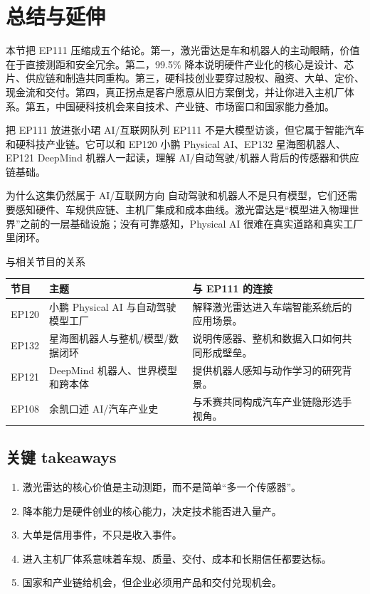 \section{总结与延伸}

本节把 EP111 压缩成五个结论。第一，激光雷达是车和机器人的主动眼睛，价值在于直接测距和安全冗余。第二，99.5\% 降本说明硬件产业化的核心是设计、芯片、供应链和制造共同重构。第三，硬科技创业要穿过股权、融资、大单、定价、现金流和交付。第四，真正拐点是客户愿意从旧方案倒戈，并让你进入主机厂体系。第五，中国硬科技机会来自技术、产业链、市场窗口和国家能力叠加。

\begin{importantbox}{把 EP111 放进张小珺 AI/互联网队列}
EP111 不是大模型访谈，但它属于智能汽车和硬科技产业链。它可以和 EP120 小鹏 Physical AI、EP132 星海图机器人、EP121 DeepMind 机器人一起读，理解 AI/自动驾驶/机器人背后的传感器和供应链基础。
\end{importantbox}

\begin{knowledgebox}{为什么这集仍然属于 AI/互联网方向}
自动驾驶和机器人不是只有模型，它们还需要感知硬件、车规供应链、主机厂集成和成本曲线。激光雷达是“模型进入物理世界”之前的一层基础设施；没有可靠感知，Physical AI 很难在真实道路和真实工厂里闭环。
\end{knowledgebox}

\begin{knowledgebox}{与相关节目的关系}
\begin{tabularx}{\textwidth}{p{}p{}X}
\toprule
节目 & 主题 & 与 EP111 的连接 \\
\midrule
EP120 & 小鹏 Physical AI 与自动驾驶模型工厂 & 解释激光雷达进入车端智能系统后的应用场景。 \\
EP132 & 星海图机器人与整机/模型/数据闭环 & 说明传感器、整机和数据入口如何共同形成壁垒。 \\
EP121 & DeepMind 机器人、世界模型和跨本体 & 提供机器人感知与动作学习的研究背景。 \\
EP108 & 余凯口述 AI/汽车产业史 & 与禾赛共同构成汽车产业链隐形选手视角。 \\
\bottomrule
\end{tabularx}
\end{knowledgebox}

\subsection{关键 takeaways}

\begin{enumerate}
\item 激光雷达的核心价值是主动测距，而不是简单“多一个传感器”。
\item 降本能力是硬件创业的核心能力，决定技术能否进入量产。
\item 大单是信用事件，不只是收入事件。
\item 进入主机厂体系意味着车规、质量、交付、成本和长期信任都要达标。
\item 国家和产业链给机会，但企业必须用产品和交付兑现机会。
\end{enumerate}

